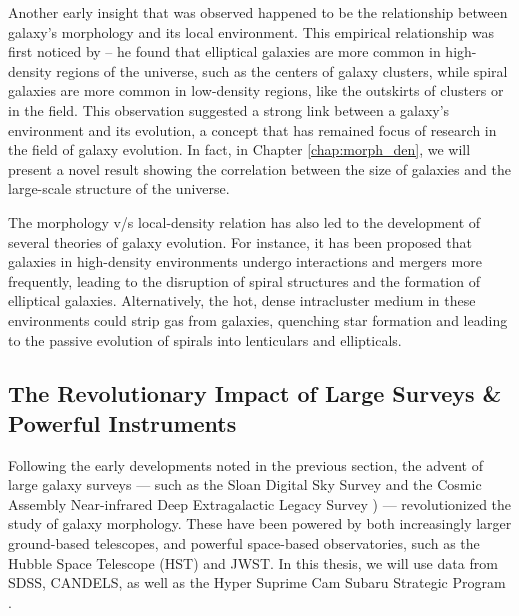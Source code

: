 Another early insight that was observed happened to be the relationship between galaxy's morphology and its local environment. This empirical relationship was first noticed by \citet{dressler_84} -- he found that elliptical galaxies are more common in high-density regions of the universe, such as the centers of galaxy clusters, while spiral galaxies are more common in low-density regions, like the outskirts of clusters or in the field. This observation suggested a strong link between a galaxy's environment and its evolution, a concept that has remained focus of research in the field of galaxy evolution. In fact, in Chapter \ref{chap:morph_den}, we will present a novel result showing the correlation between the size of galaxies and the large-scale structure of the universe. 

The morphology v/s local-density relation has also led to the development of several theories of galaxy evolution. For instance, it has been proposed that galaxies in high-density environments undergo interactions and mergers more frequently, leading to the disruption of spiral structures and the formation of elliptical galaxies. Alternatively, the hot, dense intracluster medium in these environments could strip gas from galaxies, quenching star formation and leading to the passive evolution of spirals into lenticulars and ellipticals.

\subsection{The Revolutionary Impact of Large Surveys \& Powerful Instruments} \label{sec_intro:large_surveys}

Following the early developments noted in the previous section, the advent of large galaxy surveys --- such as the Sloan Digital Sky Survey \citep[SDSS; ][]{sdss_tech_summary} and the Cosmic Assembly Near-infrared Deep Extragalactic Legacy Survey \citep[CANDELS; ][]{candels_1}) --- revolutionized the study of galaxy morphology. These have been powered by both increasingly larger ground-based telescopes, and powerful space-based observatories, such as the Hubble Space Telescope (HST) and JWST. In this thesis, we will use data from SDSS, CANDELS, as well as the Hyper Suprime Cam Subaru Strategic Program \citep[HSC-SSP; ][]{hsc_design}. 

